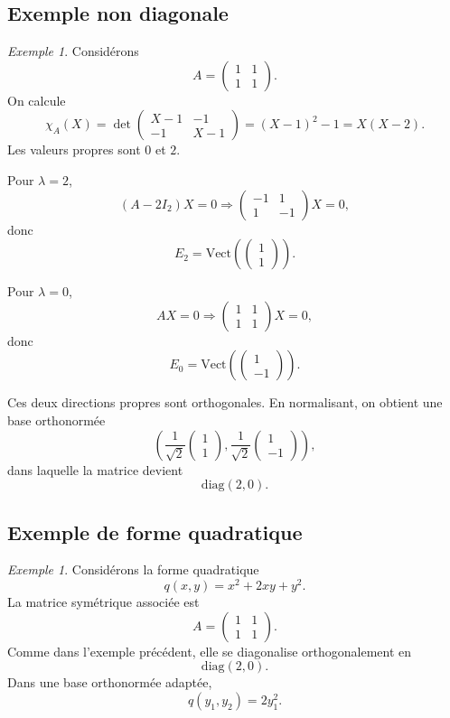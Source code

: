 \documentclass[11pt,a4paper]{article}
\theoremstyle{remark}
\newtheorem{exemple}[definition]{Exemple}
\newcommand{\Vect}{\mathrm{Vect}}
\newcommand{\diag}{\mathrm{diag}}
\begin{document}
\subsection{Exemple non diagonale}

\begin{exemple}
Considérons
\[
A=
\begin{pmatrix}
1 & 1\\
1 & 1
\end{pmatrix}.
\]
On calcule
\[
\chi_A(X)=\det\begin{pmatrix}
X-1 & -1\\
-1 & X-1
\end{pmatrix}
=(X-1)^2-1=X(X-2).
\]
Les valeurs propres sont \(0\) et \(2\).

Pour \(\lambda=2\),
\[
(A-2I_2)X=0
\Longrightarrow
\begin{pmatrix}
-1 & 1\\
1 & -1
\end{pmatrix}
X=0,
\]
donc
\[
E_2=\Vect\left(
\begin{pmatrix}
1\\1
\end{pmatrix}
\right).
\]

Pour \(\lambda=0\),
\[
AX=0
\Longrightarrow
\begin{pmatrix}
1 & 1\\
1 & 1
\end{pmatrix}
X=0,
\]
donc
\[
E_0=\Vect\left(
\begin{pmatrix}
1\\-1
\end{pmatrix}
\right).
\]

Ces deux directions propres sont orthogonales. En normalisant, on obtient une base orthonormée
\[
\left(
\frac{1}{\sqrt2}\begin{pmatrix}1\\1\end{pmatrix},
\frac{1}{\sqrt2}\begin{pmatrix}1\\-1\end{pmatrix}
\right),
\]
dans laquelle la matrice devient
\[
\diag(2,0).
\]
\end{exemple}

\subsection{Exemple de forme quadratique}

\begin{exemple}
Considérons la forme quadratique
\[
q(x,y)=x^2+2xy+y^2.
\]
La matrice symétrique associée est
\[
A=
\begin{pmatrix}
1 & 1\\
1 & 1
\end{pmatrix}.
\]
Comme dans l’exemple précédent, elle se diagonalise orthogonalement en
\[
\diag(2,0).
\]
Dans une base orthonormée adaptée,
\[
q(y_1,y_2)=2y_1^2.
\]
\end{exemple}
\end{document}
